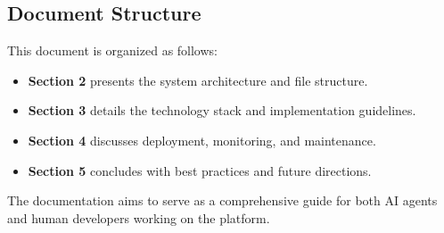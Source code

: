 \subsection{Document Structure}

This document is organized as follows:

\begin{itemize}
    \item \textbf{Section 2} presents the system architecture and file structure.
    \item \textbf{Section 3} details the technology stack and implementation guidelines.
    \item \textbf{Section 4} discusses deployment, monitoring, and maintenance.
    \item \textbf{Section 5} concludes with best practices and future directions.
\end{itemize}

The documentation aims to serve as a comprehensive guide for both AI agents and human developers working on the \sysname{} platform.
